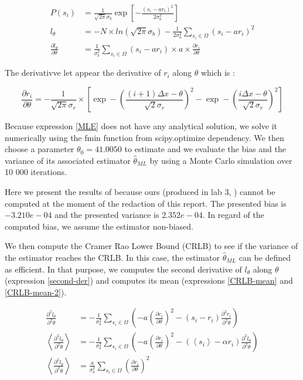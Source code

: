 \documentclass[10pt,letterpaper]{article}
\begin{document}
\begin{align}
P\left(s_{i}\right) &=\frac{1}{\sqrt{2 \pi} \sigma_b} \exp \left[-\frac{\left(s_i-a r_i\right)^2}{2 \sigma_b^2}\right] \label{law} \\ 
l_\theta &=-N \times ln\left(\sqrt{2 \pi} \sigma_b\right) - \frac{1}{2 \sigma_b^2} \sum_{s_i  \in \Omega} \left(s_i-a r_i\right)^2 \label{log-llh} \\  
\frac{\partial l_\theta}{\partial \theta} &=\frac{1}{\sigma_b^2} \sum_{s_i \in \Omega}\left(s_i-a r_i\right) \times a \times \frac{\partial r_i}{\partial \theta} \label{MLE}
\end{align}

The derivativve let appear the derivative of $r_i$ along $\theta$ which is :

\begin{equation}
     \frac{\partial r_i}{\partial \theta}=-\frac{1}{\sqrt{2 \pi} \sigma_r} \times\left[\exp -\left(\frac{(i+1) \Delta x-\theta}{\sqrt{2} \sigma_r}\right)^2-\exp -\left(\frac{i\Delta x-\theta}{\sqrt{2} \sigma_r}\right)^2\right]
\end{equation}

Because expression \ref{MLE} does not have any analytical solution, we solve it numerically using the fmin function from scipy.optimize dependency. We then choose a parameter $\theta_0 = 41.0050$ to estimate and we evaluate the bias and the variance of its associated estimator $\hat{\theta}_{ML}$ by using a Monte Carlo simulation over 10 000 iterations.

Here we present the results of \cite{project} because ours (produced in lab 3, \cite{labwork}) cannot be computed at the moment of the redaction of this report. The presented bias is $-3.210e-04$ and the presented variance is $2.352e-04$. In regard of the computed bias, we assume the estimator non-biased.

\pagebreak

We then compute the Cramer Rao Lower Bound (CRLB) to see if the variance of the estimator reaches the CRLB. In this case, the estimator $\hat{\theta}_{ML}$ can be defined as efficient. In that purpose, we computes the second derivative of $l_\theta$ along $\theta$ (expression \ref{second-der}) and computes its mean (expressions \ref{CRLB-mean} and \ref{CRLB-mean-2}).

\begin{align}
\frac{\partial^2 l_\theta}{\partial^2 \theta} &=-\frac{1}{\sigma_b^2} \sum_{s_i \in \Omega}\left(-a\left(\frac{\partial c_i}{\partial \theta}\right)^2-\left(s_i-r_i\right) \frac{\partial^2 r_i}{\partial^2 \theta}\right) \label{second-der} \\
\left\langle\frac{\partial^2 l_\theta}{\partial^2 \theta}\right\rangle &=-\frac{1}{\sigma_b^2} \sum_{s_i \in \Omega}\left(-a\left(\frac{\partial r_i}{\partial \theta}\right)^2-\left(\left\langle s_i\right\rangle-\alpha r_i\right) \frac{\partial^2 l_\theta}{\partial^2 \theta}\right) \label{CRLB-mean}\\
\left\langle\frac{\partial^2 l_\theta}{\partial^2 \theta}\right\rangle &=\frac{a}{\sigma_b^2} \sum_{s_i \in \Omega}\left(\frac{\partial r_i}{\partial \theta}\right)^2 \label{CRLB-mean-2}
\end{align}
\end{document}
